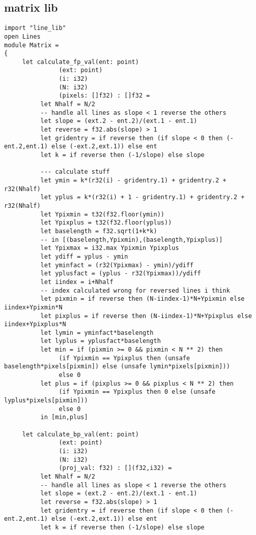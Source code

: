\subsection{matrix lib}
\begin{lstlisting}[language=Futhark]
import "line_lib"
open Lines
module Matrix =
{
     let calculate_fp_val(ent: point)
               (ext: point)
               (i: i32)
               (N: i32)
               (pixels: []f32) : []f32 =
          let Nhalf = N/2
          -- handle all lines as slope < 1 reverse the others
          let slope = (ext.2 - ent.2)/(ext.1 - ent.1)
          let reverse = f32.abs(slope) > 1
          let gridentry = if reverse then (if slope < 0 then (-ent.2,ent.1) else (-ext.2,ext.1)) else ent
          let k = if reverse then (-1/slope) else slope

          --- calculate stuff
          let ymin = k*(r32(i) - gridentry.1) + gridentry.2 + r32(Nhalf)
          let yplus = k*(r32(i) + 1 - gridentry.1) + gridentry.2 + r32(Nhalf)
          let Ypixmin = t32(f32.floor(ymin))
          let Ypixplus = t32(f32.floor(yplus))
          let baselength = f32.sqrt(1+k*k)
          -- in [(baselength,Ypixmin),(baselength,Ypixplus)]
          let Ypixmax = i32.max Ypixmin Ypixplus
          let ydiff = yplus - ymin
          let yminfact = (r32(Ypixmax) - ymin)/ydiff
          let yplusfact = (yplus - r32(Ypixmax))/ydiff
          let iindex = i+Nhalf
          -- index calculated wrong for reversed lines i think
          let pixmin = if reverse then (N-iindex-1)*N+Ypixmin else iindex+Ypixmin*N
          let pixplus = if reverse then (N-iindex-1)*N+Ypixplus else iindex+Ypixplus*N
          let lymin = yminfact*baselength
          let lyplus = yplusfact*baselength
          let min = if (pixmin >= 0 && pixmin < N ** 2) then
               (if Ypixmin == Ypixplus then (unsafe baselength*pixels[pixmin]) else (unsafe lymin*pixels[pixmin]))
               else 0
          let plus = if (pixplus >= 0 && pixplus < N ** 2) then
               (if Ypixmin == Ypixplus then 0 else (unsafe lyplus*pixels[pixmin]))
               else 0
          in [min,plus]

     let calculate_bp_val(ent: point)
               (ext: point)
               (i: i32)
               (N: i32)
               (proj_val: f32) : [](f32,i32) =
          let Nhalf = N/2
          -- handle all lines as slope < 1 reverse the others
          let slope = (ext.2 - ent.2)/(ext.1 - ent.1)
          let reverse = f32.abs(slope) > 1
          let gridentry = if reverse then (if slope < 0 then (-ent.2,ent.1) else (-ext.2,ext.1)) else ent
          let k = if reverse then (-1/slope) else slope


\end{lstlisting}
